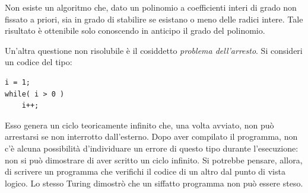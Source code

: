 Non  esiste un algoritmo che, dato un polinomio a coefficienti interi di grado non fissato a priori, sia in grado di stabilire se esistano o meno delle radici intere.
Tale risultato è ottenibile solo conoscendo in anticipo il grado del polinomio.


Un'altra  questione non risolubile è il cosiddetto \emph{problema dell'arresto}.
Si consideri un codice del tipo:
\begin{lstlisting}
i = 1;
while( i > 0 )
	i++;
\end{lstlisting}
Esso genera un ciclo teoricamente infinito che, una volta avviato, non può arrestarsi se non interrotto dall'esterno.
Dopo aver compilato il programma, non c'è alcuna possibilità d'individuare un errore di questo tipo durante l'esecuzione: non si può dimostrare di aver scritto un ciclo infinito. %
Si potrebbe pensare, allora, di scrivere un programma che verifichi il codice di un altro dal punto di vista logico.
Lo stesso Turing dimostrò che un siffatto programma non può essere steso.

